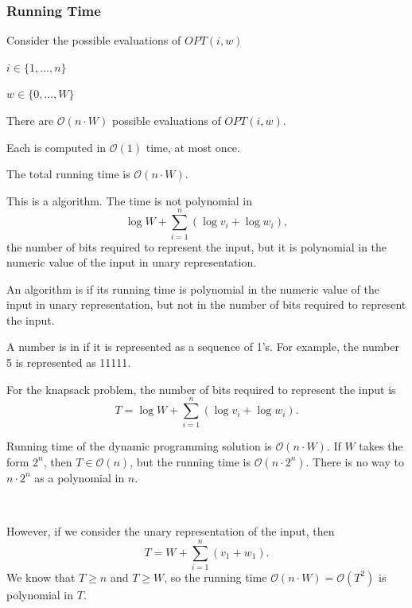 \subsubsection{Running Time}

Consider the possible evaluations of $OPT(i, w)$
\begin{listu}
    \item $i \in \{ 1, \dots, n \}$
    \item $w \in \{ 0, \dots, W \}$
    \item There are $\mathcal{O}(n \cdot W)$ possible evaluations of $OPT(i, w)$.

    Each is computed in $\mathcal{O}(1)$ time, at most once. 

    \item The total running time is $\mathcal{O}(n \cdot W)$.
\end{listu}

This is a  algorithm. The time is not polynomial in \[ \log W + \sum_{i=1}^n (\log v_i + \log w_i), \] the number of bits required to represent the input, but it is polynomial in the numeric value of the input in unary representation.

\begin{definition}\label{def:pseudo-polynomial-time-algorithm}
    An algorithm is  if its running time is polynomial in the numeric value of the input in unary representation, but not in the number of bits required to represent the input.
\end{definition}

\begin{definition}\label{def:unary-representation}
    A number is in  if it is represented as a sequence of 1's. For example, the number 5 is represented as 11111.
\end{definition}

\begin{remark}
    For the knapsack problem, the number of bits required to represent the input is \[
        T = \log W + \sum_{i=1}^n (\log v_i + \log w_i).
    \]

    Running time of the dynamic programming solution is $\mathcal{O}(n \cdot W)$. If $W$ takes the form $2^n$, then $T \in \mathcal{O}(n)$, but the running time is $\mathcal{O}(n \cdot 2^n)$. There is no way to $n \cdot 2^n$ as a polynomial in $n$.

    {~~~}

    However, if we consider the unary representation of the input, then \[ T = W + \sum_{i=1}^n (v_1 + w_1). \] We know that $T \ge n$ and $T \ge W$, so the running time $\mathcal{O}(n \cdot W) = \mathcal{O}(T^2)$ is polynomial in $T$.
\end{remark}

